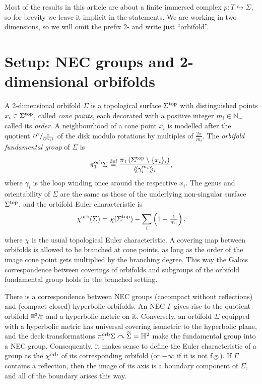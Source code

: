 \documentclass{amsart}
\newcommand{\cho}{\chi^{\textnormal{orb}}}
\newcommand{\defeq}{\stackrel{\tn{def}}{=}}
\newcommand{\pio}{\pi_1^{\textnormal{orb}}}
\newcommand{\tn}{\textnormal}
\begin{document}
Most of the results in this article are about a finite immersed complex $p\colon T\looparrowright\Sigma$, so for brevity we leave it implicit in the statements. We are working in two dimensions, so we will omit the prefix 2- and write just ``orbifold''.

\section{Setup: NEC groups and 2-dimensional orbifolds}\label{sec:simplicial}

A 2-dimensional orbifold $\Sigma$ is a topological surface $\Sigma^\tn{top}$ with distinguished points $x_i\in\Sigma^\tn{top}$, called \emph{cone points}, each decorated with a positive integer $m_i\in\mathbb{N}_+$ called its \emph{order}. A neighbourhood of a cone point $x_i$ is modelled after the quotient $\sfrac{D^2}{\frac{\mathbb{Z}}{(m_i)}}$ of the disk modulo rotations by multiples of $\tfrac{2\pi}{m_i}$. The \emph{orbifold fundamental group} of $\Sigma$ is
\begin{equation*}
\pio\Sigma\defeq\frac{\pi_1\left(\Sigma^\tn{top}\setminus\{x_i\}_i\right)}{\langle\!\langle \gamma_i^{m_i}\rangle\!\rangle_i},
\end{equation*}
where $\gamma_i$ is the loop winding once around the respective $x_i$. The genus and orientability of $\Sigma$ are the same as those of the underlying non-singular surface $\Sigma^\tn{top}$, and the orbifold Euler characteristic is
\begin{equation*}
\cho(\Sigma)=\chi(\Sigma^\tn{top})-\sum_i\left(1-\tfrac{1}{m_i}\right),
\end{equation*}
where $\chi$ is the usual topological Euler characteristic. A covering map between orbifolds is allowed to be branched at cone points, as long as the order of the image cone point gets multiplied by the branching degree. This way the Galois correspondence between coverings of orbifolds and subgroups of the orbifold fundamental group holds in the branched setting.

There is a correspondence between NEC groups (cocompact without reflections) and (compact closed) hyperbolic orbifolds. An NEC $\Gamma$ gives rise to the quotient orbifold $\sfrac{\mathbb{H}^2}{\Gamma}$ and a hyperbolic metric on it. Conversely, an orbifold $\Sigma$ equipped with a hyperbolic metric has universal covering isometric to the hyperbolic plane, and the deck transformations $\pio\Sigma\curvearrowright\widetilde\Sigma=\mathbb{H}^2$ make the fundamental group into a NEC group. Consequently, it makes sense to define the Euler characteristic of a group as the $\cho$ of its corresponding orbifold (or $-\infty$ if it is not f.g.). If $\Gamma$ contains a reflection, then the image of its axis is a boundary component of $\Sigma$, and all of the boundary arises this way.
\end{document}
